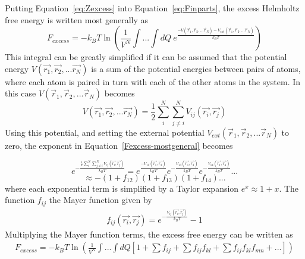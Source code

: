 \documentclass[double,12pt]{beavtex}
\begin{document}
Putting Equation~\ref{eq:Zexcess} into Equation~\ref{eq:Finparts}, 
the excess Helmholtz free energy is written most generally as
\begin{equation}\label{Fexcess-mostgeneral}{F_{excess}= -k_BT\ln{\left(\frac{1}{V^N}\int{...}\int{dQ}~e^\frac{-V(\vec{r}_1, \vec{r}_2,...\vec{r}_N)-V_{ext}(\vec{r}_1, \vec{r}_2,...\vec{r}_N)}{k_BT}\right)}}\end{equation} 
This integral can be greatly simplified if it can be assumed that the 
potential energy $V(\vec{r_1},\vec{r_2},...\vec{r_N})$ is a sum of the 
potential energies between pairs of atoms, where each atom is paired in 
turn with each of the other atoms in the system. In this case 
$V(\vec{r}_1, \vec{r}_2,...\vec{r}_N)$ becomes 
\begin{equation}{V(\vec{r_1},\vec{r_2},...\vec{r_N})=\frac{1}{2}\sum^N_i\sum^N_{j\neq{i}}V_{ij}(\vec{r_i},\vec{r_j})}\end{equation} 
Using this potential, and setting the external potential 
$V_{ext}(\vec{r}_1, \vec{r}_2,...\vec{r}_N)$ to zero, the exponent in 
Equation~\ref{Fexcess-mostgeneral} becomes

\begin{equation}{e^{-\frac{\frac{1}{2}\sum^N_i\sum^N_{j\neq{i}}V_{ij}(\vec{r_i},\vec{r_j})}{k_BT}}=e^{\frac{-V_{12}(\vec{r_1},\vec{r_2})}{k_BT}}e^{-\frac{V_{13}(\vec{r_1},\vec{r_3})}{k_BT}}e^{-\frac{V_{14}(\vec{r_1},\vec{r_4})}{k_BT}}...}\end{equation}
\begin{equation}{\approx-(1+f_{12})(1+f_{13})(1+f_{14})...}\end{equation}
where each exponential term is simplified by a Taylor expansion $e^x\approx{1+x}$.  
The function $f_{ij}$ the Mayer function given by
\begin{align}\label{eq:mayerfunction}
     f_{ij}(\vec{r_i},\vec{r_j})=e^{-\frac{V_{ij}(\vec{r_i},\vec{r_j})}{k_BT}}-1
\end{align} 
Multiplying the Mayer function terms, the excess free energy can be 
written as~\cite{schroeder}
\begin{align} \label{eq:Fexcess-simplified}
    F_{excess}=-k_BT\ln{\left(\frac{1}{V^N}\int{...}\int{dQ}\left[1 + \sum{f_{ij}} + \sum{f_{ij}f_{kl}} +\sum{f_{ij}f_{kl}f_{mn}} +... \right]\right)}
\end{align}
\end{document}
